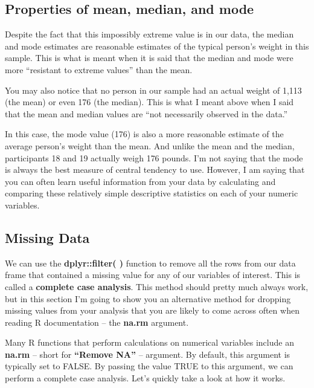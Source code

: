 \documentclass[
  letterpaper,
  DIV=11,
  numbers=noendperiod]{scrreprt}
\begin{document}
\subsection*{Properties of mean, median, and
mode}\label{properties-of-mean-median-and-mode}

Despite the fact that this impossibly extreme value is in our data, the
median and mode estimates are reasonable estimates of the typical
person's weight in this sample. This is what is meant when it is said
that the median and mode were more ``resistant to extreme values'' than
the mean.

You may also notice that no person in our sample had an actual weight of
1,113 (the mean) or even 176 (the median). This is what I meant above
when I said that the mean and median values are ``not necessarily
observed in the data.''

In this case, the mode value (176) is also a more reasonable estimate of
the average person's weight than the mean. And unlike the mean and the
median, participants 18 and 19 actually weigh 176 pounds. I'm not saying
that the mode is always the best measure of central tendency to use.
However, I am saying that you can often learn useful information from
your data by calculating and comparing these relatively simple
descriptive statistics on each of your numeric variables.

\subsection*{Missing Data}\label{missing-data}

We can use the \textbf{dplyr::filter( )} function to remove all the rows
from our data frame that contained a missing value for any of our
variables of interest. This is called a \textbf{complete case analysis}.
This method should pretty much always work, but in this section I'm
going to show you an alternative method for dropping missing values from
your analysis that you are likely to come across often when reading R
documentation -- the \textbf{na.rm} argument.

Many R functions that perform calculations on numerical variables
include an \textbf{na.rm} -- short for \textbf{``Remove NA''} --
argument. By default, this argument is typically set to FALSE. By
passing the value TRUE to this argument, we can perform a complete case
analysis. Let's quickly take a look at how it works.
\end{document}
